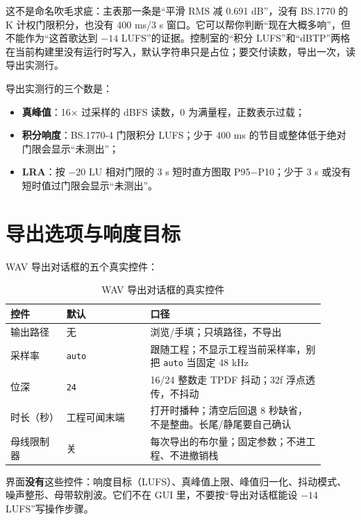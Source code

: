 这不是命名吹毛求疵：主表那一条是“平滑 RMS 减 0.691 dB”，没有 BS.1770 的 K 计权门限积分，也没有 400 ms/3 s 窗口。它可以帮你判断“现在大概多响”，但不能作为“这首歌达到 $-14$ LUFS”的证据。控制室的“积分 LUFS”和“dBTP”两格在当前构建里没有运行时写入，默认字符串只是占位；要交付读数，导出一次，读导出实测行。


导出实测行的三个数是：

\begin{itemize}
  \item \textbf{真峰值}：16× 过采样的 dBFS 读数，0 为满量程，正数表示过载；
  \item \textbf{积分响度}：BS.1770-4 门限积分 LUFS；少于 400 ms 的节目或整体低于绝对门限会显示“未测出”；
  \item \textbf{LRA}：按 $-20$ LU 相对门限的 3 s 短时直方图取 P95−P10；少于 3 s 或没有短时值过门限会显示“未测出”。
\end{itemize}

\section{导出选项与响度目标}

WAV 导出对话框的五个真实控件：

\begin{table}[htbp]
\centering
\small
\begin{tabular}{@{}p{0.16\linewidth}p{0.24\linewidth}p{0.50\linewidth}@{}}
\hline
控件 & 默认 & 口径 \\
\hline
输出路径 & 无 & 浏览/手填；只填路径，不导出 \\
采样率 & \texttt{auto} & 跟随工程；不显示工程当前采样率，别把 \texttt{auto} 当固定 48 kHz \\
位深 & \texttt{24} & 16/24 整数走 TPDF 抖动；32f 浮点透传，不抖动 \\
时长（秒） & 工程可闻末端 & 打开时播种；清空后回退 8 秒缺省，不是整曲。长尾/静尾要自己确认 \\
母线限制器 & 关 & 每次导出的布尔量；固定参数；不进工程、不进撤销栈 \\
\hline
\end{tabular}
\caption{WAV 导出对话框的真实控件}
\label{tab:export-options}
\end{table}

界面\textbf{没有}这些控件：响度目标（LUFS）、真峰值上限、峰值归一化、抖动模式、噪声整形、母带软削波。它们不在 GUI 里，不要按“导出对话框能设 $-14$ LUFS”写操作步骤。

